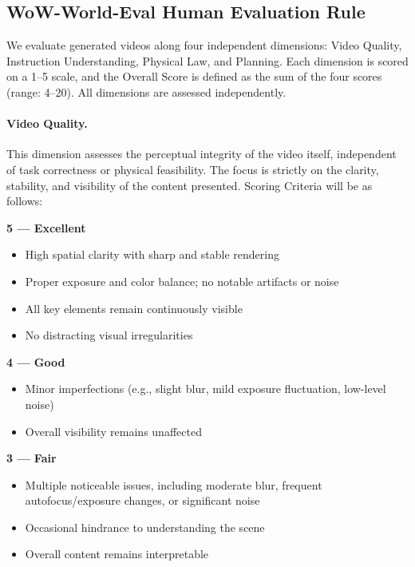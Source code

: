 \subsection{WoW-World-Eval Human Evaluation Rule}
We evaluate generated videos along four independent dimensions: Video Quality, Instruction Understanding, Physical Law, and Planning.
Each dimension is scored on a 1–5 scale, and the Overall Score is defined as the sum of the four scores (range: 4–20).
All dimensions are assessed independently.

\paragraph{Video Quality.} This dimension assesses the perceptual integrity of the video itself, independent of task correctness or physical feasibility. The focus is strictly on the clarity, stability, and visibility of the content presented. Scoring Criteria will be as follows:

\textbf{5 — Excellent}\par
\begin{itemize}
    \item High spatial clarity with sharp and stable rendering
    \item Proper exposure and color balance; no notable artifacts or noise
    \item All key elements remain continuously visible
    \item No distracting visual irregularities
\end{itemize}

\textbf{4 — Good}\par
\begin{itemize}
    \item Minor imperfections (e.g., slight blur, mild exposure fluctuation, low-level noise)
    \item Overall visibility remains unaffected
\end{itemize}
 
\textbf{3 — Fair}\par
\begin{itemize}
    \item Multiple noticeable issues, including moderate blur, frequent autofocus/exposure changes, or significant noise
    \item Occasional hindrance to understanding the scene
    \item Overall content remains interpretable
\end{itemize}

